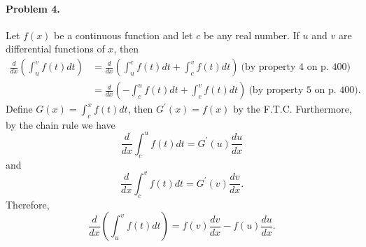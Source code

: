 \documentclass{article}
\begin{document}
\paragraph*{Problem 4.} Let $f(x)$ be a continuous function and let $c$ be any real number. If $u$ and $v$ are differential functions of $x$, then
\begin{align*}
\frac{d}{dx}\left(\int_{u}^{v}f(t)dt\right) &= \frac{d}{dx}\left(\int_{u}^{c}f(t)dt+\int_{c}^{v}f(t)dt\right)~\text{(by property 4 on p. 400)} \\
&= \frac{d}{dx}\left(-\int_{c}^{u}f(t)dt+\int_{c}^{v}f(t)dt\right)~\text{(by property 5 on p. 400)}.
\end{align*}
Define $G(x)=\int_{c}^{x}f(t)dt$, then $G^{'}(x)=f(x)$ by the F.T.C. Furthermore, by the chain rule we have
\[
\frac{d}{dx}\int_{c}^{u}f(t)dt = G^{'}(u)\frac{du}{dx}
\]
and
\[
\frac{d}{dx}\int_{c}^{v}f(t)dt = G^{'}(v)\frac{dv}{dx}.
\]
Therefore,
\[
\frac{d}{dx}\left(\int_{u}^{v}f(t)dt\right) = f(v)\frac{dv}{dx}-f(u)\frac{du}{dx}.
\]
\end{document}
